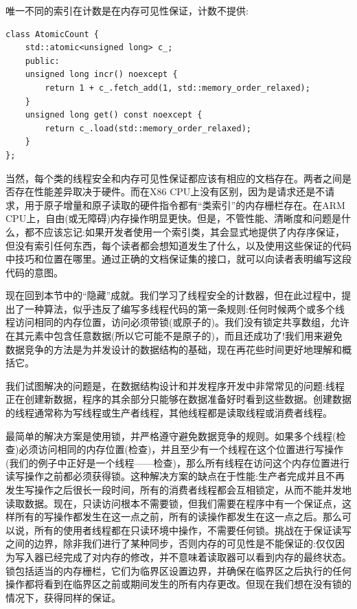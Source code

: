 唯一不同的索引在计数是在内存可见性保证，计数不提供:

\begin{lstlisting}[style=styleCXX]
class AtomicCount {
	std::atomic<unsigned long> c_;
	public:
	unsigned long incr() noexcept {
		return 1 + c_.fetch_add(1, std::memory_order_relaxed);
	}
	unsigned long get() const noexcept {
		return c_.load(std::memory_order_relaxed);
	}
};
\end{lstlisting}

当然，每个类的线程安全和内存可见性保证都应该有相应的文档存在。两者之间是否存在性能差异取决于硬件。而在X86 CPU上没有区别，因为是请求还是不请求，用于原子增量和原子读取的硬件指令都有“类索引”的内存栅栏存在。在ARM CPU上，自由(或无障碍)内存操作明显更快。但是，不管性能、清晰度和问题是什么，都不应该忘记:如果开发者使用一个索引类，其会显式地提供了内存序保证，但没有索引任何东西，每个读者都会想知道发生了什么，以及使用这些保证的代码中技巧和位置在哪里。通过正确的文档保证集的接口，就可以向读者表明编写这段代码的意图。

现在回到本节中的“隐藏”成就。我们学习了线程安全的计数器，但在此过程中，提出了一种算法，似乎违反了编写多线程代码的第一条规则:任何时候两个或多个线程访问相同的内存位置，访问必须带锁(或原子的)。我们没有锁定共享数组，允许在其元素中包含任意数据(所以它可能不是原子的)，而且还成功了!我们用来避免数据竞争的方法是为并发设计的数据结构的基础，现在再花些时间更好地理解和概括它。


我们试图解决的问题是，在数据结构设计和并发程序开发中非常常见的问题:线程正在创建新数据，程序的其余部分只能够在数据准备好时看到这些数据。创建数据的线程通常称为写线程或生产者线程，其他线程都是读取线程或消费者线程。

最简单的解决方案是使用锁，并严格遵守避免数据竞争的规则。如果多个线程(检查)必须访问相同的内存位置(检查)，并且至少有一个线程在这个位置进行写操作(我们的例子中正好是一个线程——检查)，那么所有线程在访问这个内存位置进行读写操作之前都必须获得锁。这种解决方案的缺点在于性能:生产者完成并且不再发生写操作之后很长一段时间，所有的消费者线程都会互相锁定，从而不能并发地读取数据。现在，只读访问根本不需要锁，但我们需要在程序中有一个保证点，这样所有的写操作都发生在这一点之前，所有的读操作都发生在这一点之后。那么可以说，所有的使用者线程都在只读环境中操作，不需要任何锁。挑战在于保证读写之间的边界，除非我们进行了某种同步，否则内存的可见性是不能保证的:仅仅因为写入器已经完成了对内存的修改，并不意味着读取器可以看到内存的最终状态。锁包括适当的内存栅栏，它们为临界区设置边界，并确保在临界区之后执行的任何操作都将看到在临界区之前或期间发生的所有内存更改。但现在我们想在没有锁的情况下，获得同样的保证。

